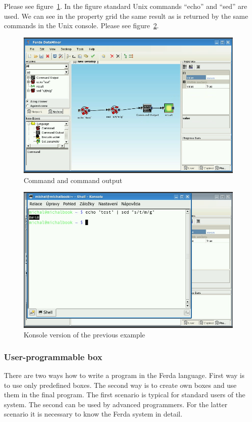 \documentclass[a4paper,12pt]{book}
\begin{document}
Please see figure~\ref{fig:boxCommand}. In the figure standard Unix commands ``echo'' and ``sed'' are used. We can see in the property grid the same result as is returned by the same commands in the Unix console. Please see figure~\ref{fig:CommandKonsole}.

\begin{figure}
	\includegraphics[width=1\textwidth]{command2.png}
	\caption{Command and command output}
	\label{fig:boxCommand}
\end{figure}

\begin{figure}
	\includegraphics[width=1\textwidth]{command3.png}
	\caption{Konsole version of the previous example}
	\label{fig:CommandKonsole}
\end{figure}

\subsubsection{User-programmable box}
There are two ways how to write a program in the Ferda language. First way is to use only predefined boxes. The second way is to create own boxes and use them in the final program. The first scenario is typical for standard users of the system. The second can be used by advanced programmers. For the latter scenario it is necessary to know the Ferda system in detail.
\end{document}
